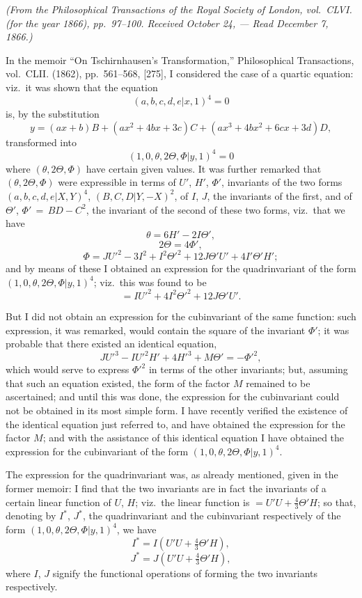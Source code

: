 \documentclass[11pt,a4paper]{article}
\theoremstyle{plain}
\begin{document}
\begin{flushright}
\textit{(From the Philosophical Transactions of the Royal Society of London, vol.~CLVI. (for the year 1866), pp.~97--100. Received October 24, --- Read December 7, 1866.)}
\end{flushright}

In the memoir ``On Tschirnhausen's Transformation,'' Philosophical Transactions, vol.~CLII. (1862), pp.~561--568, [275], I considered the case of a quartic equation: viz.\ it was shown that the equation
\[
(a,b,c,d,e  |  x, 1)^4 = 0
\]
is, by the substitution
\[
y = (ax+b)B + (ax^2 + 4bx + 3c)C + (ax^3 + 4bx^2 + 6cx + 3d)D,
\]
transformed into
\[
(1, 0, \theta, 2\Theta, \Phi  |  y, 1)^4 = 0
\]
where $(\theta, 2\Theta, \Phi)$ have certain given values. It was further remarked that $(\theta, 2\Theta, \Phi)$ were expressible in terms of $U'$, $H'$, $\Phi'$, invariants of the two forms $(a,b,c,d,e  |  X, Y)^4$, $(B,C,D  |  Y, -X)^2$, of $I$, $J$, the invariants of the first, and of $\Theta'$, $\Phi' \,{=}\, BD - C^2$, the invariant of the second of these two forms, viz.\ that we have
\[
\theta = 6H' - 2I\Theta',
\]
\[
2\Theta = 4\Phi',
\]
\[
\Phi = JU'^2 - 3I^2 + I^2\Theta'^2 + 12J\Theta'U' + 4I'\Theta'H';
\]
and by means of these I obtained an expression for the quadrinvariant of the form $(1, 0, \theta, 2\Theta, \Phi  |  y, 1)^4$; viz.\ this was found to be
\[
= IU'^2 + 4I^2\Theta'^2 + 12J\Theta'U'.
\]

But I did not obtain an expression for the cubinvariant of the same function: such expression, it was remarked, would contain the square of the invariant $\Phi'$; it was probable that there existed an identical equation,
\[
JU'^3 - IU'^2H' + 4H'^3 + M\Theta' = -\Phi'^2,
\]
which would serve to express $\Phi'^2$ in terms of the other invariants; but, assuming that such an equation existed, the form of the factor $M$ remained to be ascertained; and until this was done, the expression for the cubinvariant could not be obtained in its most simple form. I have recently verified the existence of the identical equation just referred to, and have obtained the expression for the factor $M$; and with the assistance of this identical equation I have obtained the expression for the cubinvariant of the form $(1, 0, \theta, 2\Theta, \Phi  |  y, 1)^4$.

The expression for the quadrinvariant was, as already mentioned, given in the former memoir: I find that the two invariants are in fact the invariants of a certain linear function of $U$, $H$; viz.\ the linear function is $= U'U + \frac43\Theta'H$; so that, denoting by $I^*$, $J^*$, the quadrinvariant and the cubinvariant respectively of the form $(1, 0, \theta, 2\Theta, \Phi  |  y, 1)^4$, we have
\[
I^* = I(U'U + \tfrac43\Theta'H),
\]
\[
J^* = J(U'U + \tfrac43\Theta'H),
\]
where $I$, $J$ signify the functional operations of forming the two invariants respectively.
\end{document}
